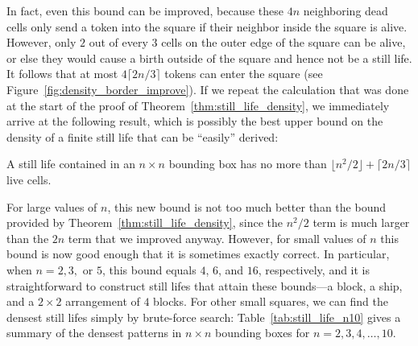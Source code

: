 In fact, even this bound can be improved, because these $4n$ neighboring dead cells only send a token into the square if their neighbor inside the square is alive. However, only $2$ out of every $3$ cells on the outer edge of the square can be alive, or else they would cause a birth outside of the square and hence not be a still life. It follows that at most $4\lceil 2n/3 \rceil$ tokens can enter the square (see Figure~\ref{fig:density_border_improve}). If we repeat the calculation that was done at the start of the proof of Theorem~\ref{thm:still_life_density}, we immediately arrive at the following result, which is possibly the best upper bound on the density of a finite still life that can be ``easily'' derived:

\begin{proposition}\label{prop:still_life_density_better}
	A still life contained in an $n \times n$ bounding box has no more than $\lfloor n^2/2 \rfloor + \lceil 2n/3 \rceil$ live cells.
\end{proposition}

For large values of $n$, this new bound is not too much better than the bound provided by Theorem~\ref{thm:still_life_density}, since the $n^2/2$ term is much larger than the $2n$ term that we improved anyway. However, for small values of $n$ this bound is now good enough that it is sometimes exactly correct. In particular, when $n = 2, 3,$ or $5$, this bound equals $4$, $6$, and $16$, respectively, and it is straightforward to construct still lifes that attain these bounds---a block, a ship, and a $2 \times 2$ arrangement of $4$ blocks. For other small squares, we can find the densest still lifes simply by brute-force search: Table~\ref{tab:still_life_n10} gives a summary of the densest patterns in $n \times n$ bounding boxes for $n = 2, 3, 4, \ldots, 10$.

